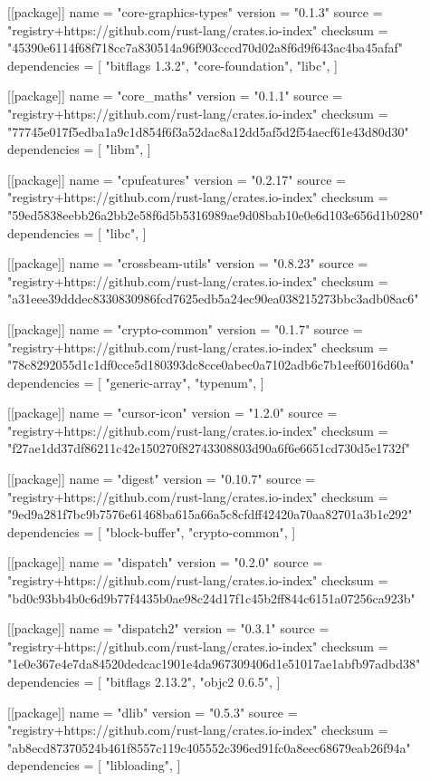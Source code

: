 [[package]]
name = "core-graphics-types"
version = "0.1.3"
source = "registry+https://github.com/rust-lang/crates.io-index"
checksum = "45390e6114f68f718cc7a830514a96f903cccd70d02a8f6d9f643ac4ba45afaf"
dependencies = [
 "bitflags 1.3.2",
 "core-foundation",
 "libc",
]

[[package]]
name = "core_maths"
version = "0.1.1"
source = "registry+https://github.com/rust-lang/crates.io-index"
checksum = "77745e017f5edba1a9c1d854f6f3a52dac8a12dd5af5d2f54aecf61e43d80d30"
dependencies = [
 "libm",
]

[[package]]
name = "cpufeatures"
version = "0.2.17"
source = "registry+https://github.com/rust-lang/crates.io-index"
checksum = "59ed5838eebb26a2bb2e58f6d5b5316989ae9d08bab10e0e6d103e656d1b0280"
dependencies = [
 "libc",
]

[[package]]
name = "crossbeam-utils"
version = "0.8.23"
source = "registry+https://github.com/rust-lang/crates.io-index"
checksum = "a31eee39dddec8330830986fcd7625edb5a24ec90ea038215273bbc3adb08ac6"

[[package]]
name = "crypto-common"
version = "0.1.7"
source = "registry+https://github.com/rust-lang/crates.io-index"
checksum = "78c8292055d1c1df0cce5d180393dc8cce0abec0a7102adb6c7b1eef6016d60a"
dependencies = [
 "generic-array",
 "typenum",
]

[[package]]
name = "cursor-icon"
version = "1.2.0"
source = "registry+https://github.com/rust-lang/crates.io-index"
checksum = "f27ae1dd37df86211c42e150270f82743308803d90a6f6e6651cd730d5e1732f"

[[package]]
name = "digest"
version = "0.10.7"
source = "registry+https://github.com/rust-lang/crates.io-index"
checksum = "9ed9a281f7bc9b7576e61468ba615a66a5c8cfdff42420a70aa82701a3b1e292"
dependencies = [
 "block-buffer",
 "crypto-common",
]

[[package]]
name = "dispatch"
version = "0.2.0"
source = "registry+https://github.com/rust-lang/crates.io-index"
checksum = "bd0c93bb4b0c6d9b77f4435b0ae98c24d17f1c45b2ff844c6151a07256ca923b"

[[package]]
name = "dispatch2"
version = "0.3.1"
source = "registry+https://github.com/rust-lang/crates.io-index"
checksum = "1e0e367e4e7da84520dedcac1901e4da967309406d1e51017ae1abfb97adbd38"
dependencies = [
 "bitflags 2.13.2",
 "objc2 0.6.5",
]

[[package]]
name = "dlib"
version = "0.5.3"
source = "registry+https://github.com/rust-lang/crates.io-index"
checksum = "ab8ecd87370524b461f8557c119c405552c396ed91fc0a8eec68679eab26f94a"
dependencies = [
 "libloading",
]


